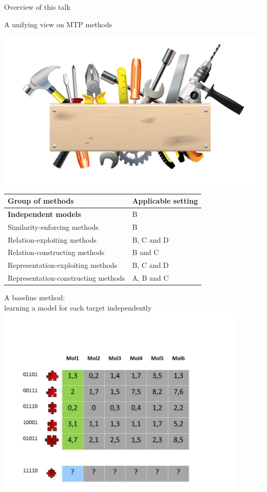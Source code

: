 \documentclass[]{beamer}
\renewcommand{\alert}[1]{\textbf{\color{putblue} #1}}
\begin{document}
\begin{frame}{Overview of this talk}

\tableofcontents

\end{frame}

\begin{frame}{A unifying view on MTP methods}

\begin{center}
\includegraphics[scale=0.3]{pics/tools}

\begin{tabular}{ll}
\hline
Group of methods & Applicable setting \\
\hline
\hline
\alert{Independent models} & B \\
Similarity-enforcing methods & B   \\ 
Relation-exploiting methods & B, C and D  \\
Relation-constructing methods & B and C \\
Representation-exploiting methods & B, C and D \\
Representation-constructing methods & A, B and C \\
\hline  
\end{tabular}
\end{center}
\end{frame}

\begin{frame}{A baseline method:\\
learning a model for each target independently}
\includegraphics[width=0.9\textwidth,trim = 0 0 100 100,clip]{Figures/pictures/Slide13}
\end{frame}
\end{document}
